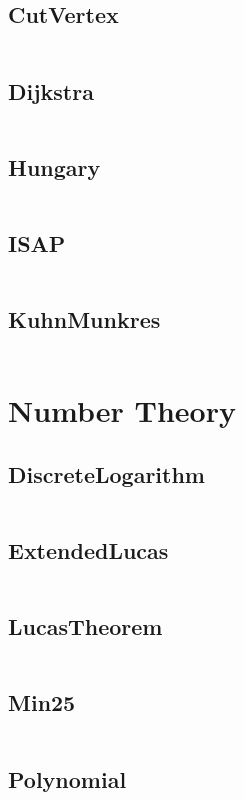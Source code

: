   \subsection{CutVertex}
    \inputminted{cpp}{src/6_Graph Theory/5_CutVertex.cpp}
  \subsection{Dijkstra}
    \inputminted{cpp}{src/6_Graph Theory/6_Dijkstra.cpp}
  \subsection{Hungary}
    \inputminted{cpp}{src/6_Graph Theory/7_Hungary.cpp}
  \subsection{ISAP}
    \inputminted{cpp}{src/6_Graph Theory/8_ISAP.cpp}
  \subsection{KuhnMunkres}
    \inputminted{cpp}{src/6_Graph Theory/9_KuhnMunkres.cpp}
\section{Number Theory}
  \subsection{DiscreteLogarithm}
    \inputminted{cpp}{src/7_Number Theory/1_DiscreteLogarithm.cpp}
  \subsection{ExtendedLucas}
    \inputminted{cpp}{src/7_Number Theory/2_ExtendedLucas.cpp}
  \subsection{LucasTheorem}
    \inputminted{cpp}{src/7_Number Theory/3_LucasTheorem.cpp}
  \subsection{Min25}
    \inputminted{cpp}{src/7_Number Theory/4_Min25.cpp}
  \subsection{Polynomial}
    \inputminted{cpp}{src/7_Number Theory/5_Polynomial.cpp}
